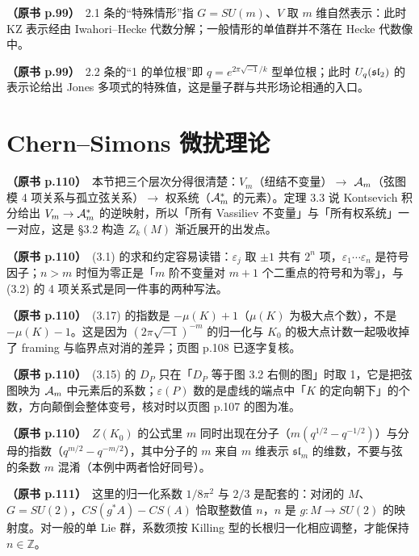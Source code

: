 \noindent \textbf{（原书 p.99）}\ 2.1 条的“特殊情形”指 $G=SU(m)$、$V$ 取 $m$ 维自然表示：此时 KZ 表示经由 Iwahori--Hecke 代数分解；一般情形的单值群并不落在 Hecke 代数像中。\par\smallskip

\noindent \textbf{（原书 p.99）}\ 2.2 条的“1 的单位根”即 $q=e^{2\pi\sqrt{-1}/k}$ 型单位根；此时 $U_q(\mathfrak{sl}_2)$ 的表示论给出 Jones 多项式的特殊值，这是量子群与共形场论相通的入口。\par\smallskip

\section*{Chern--Simons 微扰理论}

\noindent \textbf{（原书 p.110）}\ 本节把三个层次分得很清楚：$V_m$（纽结不变量）$\to$ $\mathcal{A}_m$（弦图模 4 项关系与孤立弦关系）$\to$ 权系统（$\mathcal{A}_m^{*}$ 的元素）。定理 3.3 说 Kontsevich 积分给出 $V_m \to \mathcal{A}_m^{*}$ 的逆映射，所以「所有 Vassiliev 不变量」与「所有权系统」一一对应，这是 §3.2 构造 $Z_k(M)$ 渐近展开的出发点。\par\smallskip

\noindent \textbf{（原书 p.110）}\ (3.1) 的求和约定容易读错：$\varepsilon_j$ 取 $\pm1$ 共有 $2^{n}$ 项，$\varepsilon_1\cdots\varepsilon_n$ 是符号因子；$n>m$ 时恒为零正是「$m$ 阶不变量对 $m+1$ 个二重点的符号和为零」，与 (3.2) 的 4 项关系式是同一件事的两种写法。\par\smallskip

\noindent \textbf{（原书 p.110）}\ (3.17) 的指数是 $-\mu(K)+1$（$\mu(K)$ 为极大点个数），不是 $-\mu(K)-1$。这是因为 $(2\pi\sqrt{-1})^{-m}$ 的归一化与 $K_0$ 的极大点计数一起吸收掉了 framing 与临界点对消的差异；页图 p.108 已逐字复核。\par\smallskip

\noindent \textbf{（原书 p.110）}\ (3.15) 的 $D_P$ 只在「$D_P$ 等于图 3.2 右侧的图」时取 1，它是把弦图映为 $\mathcal{A}_m$ 中元素后的系数；$\varepsilon(P)$ 数的是虚线的端点中「$K$ 的定向朝下」的个数，方向颠倒会整体变号，核对时以页图 p.107 的图为准。\par\smallskip

\noindent \textbf{（原书 p.110）}\ $Z(K_0)$ 的公式里 $m$ 同时出现在分子（$m(q^{1/2}-q^{-1/2})$）与分母的指数（$q^{m/2}-q^{-m/2}$），其中分子的 $m$ 来自 $m$ 维表示 $\mathfrak{sl}_m$ 的维数，不要与弦的条数 $m$ 混淆（本例中两者恰好同号）。\par\smallskip

\noindent \textbf{（原书 p.111）}\ 这里的归一化系数 $1/8\pi^{2}$ 与 $2/3$ 是配套的：对闭的 $M$、$G=SU(2)$，$CS(g^{*}A)-CS(A)$ 恰取整数值 $n$，$n$ 是 $g\colon M\to SU(2)$ 的映射度。对一般的单 Lie 群，系数须按 Killing 型的长根归一化相应调整，才能保持 $n\in\mathbb{Z}$。\par\smallskip

